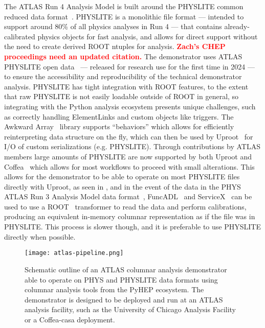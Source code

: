 The ATLAS Run 4 Analysis Model is built around the PHYSLITE common reduced data format~\cite{Schaarschmidt:2024vzr,SOFT-2022-02}.
PHYSLITE is a monolithic file format --- intended to support around 80\% of all physics analyses in Run 4 --- that contains already-calibrated physics objects for fast analysis, and allows for direct support without the need to create derived ROOT ntuples for analysis.
\textbf{\textcolor{red}{Zach's CHEP proceedings need an updated citation.}}
The demonstrator uses ATLAS PHYSLITE open data~\cite{ATL-OREACH-PROC-2024-005,Marshall:2919097} --- released for research use for the first time in 2024 --- to ensure the accessibility and reproducibility of the technical demonstrator analysis.
PHYSLITE has tight integration with ROOT features, to the extent that raw PHYSLITE is not easily loadable outside of ROOT in general, so integrating with the Python analysis ecosystem presents unique challenges, such as correctly handling ElementLinks and custom objects like triggers.
The Awkward Array~\cite{Awkward_Array_2018} library supports ``behaviors'' which allows for efficiently reinterpreting data structure on the fly, which can then be used by Uproot~\cite{Uproot_2017} for I/O of custom serializations (e.g. PHYSLITE).
Through contributions by ATLAS members large amounts of PHYSLITE are now supported by both Uproot and Coffea~\cite{Coffea_2023,CMS:2020kpn} which allows for most workflows to proceed with small alterations.
This allows for the demonstrator to be able to operate on most PHYSLITE files directly with Uproot, as seen in , and in the event of the data in the PHYS ATLAS Run 3 Analysis Model data format~\cite{SOFT-2022-02}, FuncADL~\cite{funcadl_2024,Proffitt:2021wfh} and ServiceX~\cite{serviceX_2024,serviceX_client_2024,Galewsky:2020xig} can be used to use a ROOT~\cite{Brun:1997pa} transformer to read the data and perform calibrations, producing an equivalent in-memory columnar representation as if the file was in PHYSLITE.
This process is slower though, and it is preferable to use PHYSLITE directly when possible.

\begin{figure}
    \centering
    \texttt{[image: atlas-pipeline.png]}
    \caption{Schematic outline of an ATLAS columnar analysis demonstrator able to operate on PHYS and PHYSLITE data formats using columnar analysis tools from the PyHEP ecosystem.
    The demonstrator is designed to be deployed and run at an ATLAS analysis facility, such as the University of Chicago Analysis Facility or a Coffea-casa deployment.}
    \label{fig:atlas-pipeline}
\end{figure}
